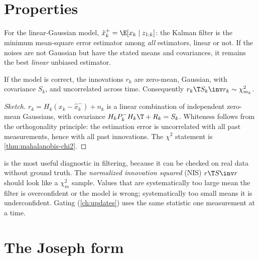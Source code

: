 \section{Properties}

\begin{proposition}[Optimality]
For the linear-Gaussian model, $\hat x_k^+ = \E[x_k\mid z_{1:k}]$: the Kalman filter is the minimum
mean-square error estimator among \emph{all} estimators, linear or not. If the noises are not
Gaussian but have the stated means and covariances, it remains the best \emph{linear} unbiased
estimator.
\end{proposition}

\begin{proposition}
\label{prop:innovation}
If the model is correct, the innovations $r_k$ are zero-mean, Gaussian, with covariance $S_k$, and
uncorrelated across time. Consequently $r_k\T S_k\inv r_k \sim \chi^2_{m_k}$.
\end{proposition}
\begin{proof}[Sketch]
$r_k = H_k(x_k - \hat x_k^-) + n_k$ is a linear combination of independent zero-mean Gaussians, with
covariance $H_kP_k^-H_k\T + R_k = S_k$. Whiteness follows from the orthogonality principle: the
estimation error is uncorrelated with all past measurements, hence with all past innovations.
The $\chi^2$ statement is \cref{thm:mahalanobis-chi2}.
\end{proof}

 is the most useful diagnostic in filtering, because it can be checked on real data
without ground truth. The \emph{normalized innovation squared} (NIS) $r\T S\inv r$ should look like a
$\chi^2_m$ sample. Values that are systematically too large mean the filter is overconfident or the model
is wrong; systematically too small means it is underconfident. Gating (\cref{ch:updates}) uses the same
statistic one measurement at a time.

\section{The Joseph form}
\label{sec:joseph}

